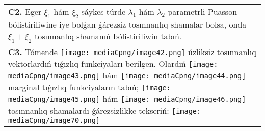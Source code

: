 \documentclass{article}
\begin{document}
\begin{tabular}{m{17cm}}
 \\
\textbf{C2.} Eger \(\xi_{1}\) hám \(\xi_{2}\) sáykes túrde \(\lambda_{1}\) hám \(\lambda_{2}\) parametrli Puasson bólistiriliwine iye bolǵan ǵárezsiz tosınnanlıq shamalar bolsa, onda \(\xi_{1} + \xi_{2}\) tosınnanlıq shamanıń bólistiriliwin tabıń.
 \\
\textbf{C3.} Tómende \texttt{[image: mediaCpng/image42.png]} úzliksiz tosınnanlıq vektorlardıń tıǵızlıq funkciyaları berilgen. Olardıń \texttt{[image: mediaCpng/image43.png]} hám \texttt{[image: mediaCpng/image44.png]} marginal tıǵızlıq funkciyaların tabıń; \texttt{[image: mediaCpng/image45.png]} hám \texttt{[image: mediaCpng/image46.png]} tosınnanlıq shamalardı ǵárezsizlikke tekseriń: \texttt{[image: mediaCpng/image70.png]}
 \\

\end{tabular}
\vspace{1cm}
\end{document}
